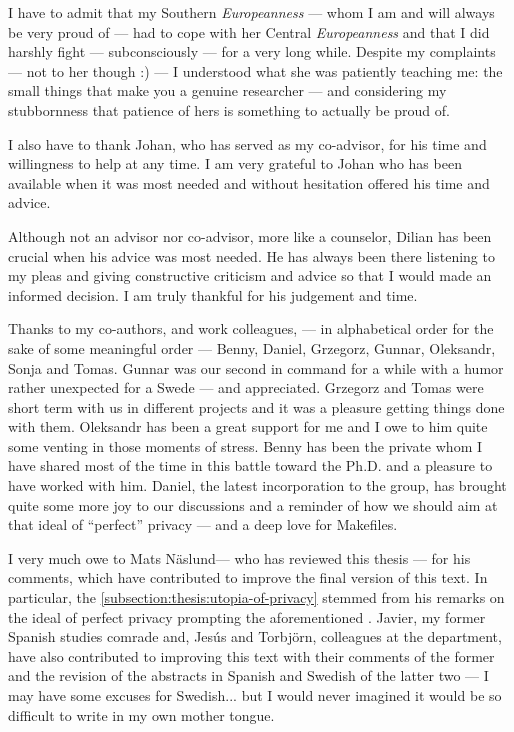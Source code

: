 I have to admit that my Southern \emph{Europeanness} --- whom I am and will always 
be very proud of --- had to cope with her Central \emph{Europeanness} and that I 
did harshly fight --- subconsciously --- for a very long while. Despite my complaints 
--- not to her though :) --- I understood what she was patiently teaching me: the 
small things that make you a genuine researcher --- and considering my stubbornness 
that patience of hers is something to actually be proud of.

I also have to thank Johan, who has served as my co-advisor, for his time and willingness 
to help at any time. I am very grateful to Johan who has been available when it 
was most needed and without hesitation offered his time and advice. 

Although not an advisor nor co-advisor, more like a counselor, Dilian has been crucial 
when his advice was most needed. He has always been there listening to my pleas 
and giving constructive criticism and advice so that I would made an informed decision. 
I am truly thankful for his judgement and time.

Thanks to my co-authors, and work colleagues, --- in alphabetical order for the 
sake of some meaningful order --- Benny, Daniel, Grzegorz, Gunnar, Oleksandr, Sonja 
and Tomas. Gunnar was our second in command for a while with a humor rather unexpected 
for a Swede --- and appreciated. Grzegorz and Tomas were short term with us in different 
projects and it was a pleasure getting things done with them. Oleksandr has been 
a great support for me and I owe to him quite some venting in those moments of stress. 
Benny has been the private whom I have shared most of the time in this battle toward 
the Ph.D. and a pleasure to have worked with him. Daniel, the latest incorporation 
to the group, has brought quite some more joy to our discussions and a reminder 
of how we should aim at that ideal of ``perfect'' privacy --- and a deep love for 
Makefiles.

I very much owe to Mats N\"{a}slund--- who has reviewed this thesis --- for his 
comments, which have contributed to improve the final version of this text. In particular, 
the  \cref{subsection:thesis:utopia-of-privacy} 
stemmed from his remarks on the ideal of perfect privacy prompting the aforementioned 
. Javier, my former Spanish studies 
comrade and, Jes\'{u}s and Torbj\"{o}rn, colleagues at the department, have also 
contributed to improving this text with their comments of the former and the revision 
of the abstracts in Spanish and Swedish of the latter two --- I may have some excuses 
for Swedish... but I would never imagined it would be so difficult to write in my 
own mother tongue. 

